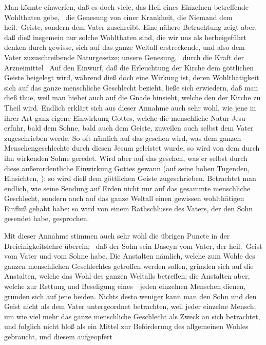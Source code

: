 \begin{aufza}
\begin{aufzb}
\begin{RWanm} 
Man könnte einwerfen, daß es doch viele, das Heil eines Einzelnen betreffende Wohlthaten gebe, \zB\ die Genesung von einer Krankheit, die Niemand dem heil.\ Geiste, sondern dem Vater zuschreibt. Eine nähere Betrachtung zeigt aber, daß dieß insgemein nur solche Wohlthaten sind, die wir uns als herbeigeführt denken durch gewisse, sich auf das ganze Weltall erstreckende, und also dem Vater zuzuschreibende Naturgesetze; unsere Genesung, \zB\ durch die Kraft der Arzneimittel \udgl\  Auf den Einwurf, daß die Erleuchtung der Kirche dem göttlichen Geiste beigelegt wird, während dieß doch eine Wirkung ist, deren Wohlthätigkeit sich auf das ganze menschliche Geschlecht bezieht, ließe sich erwiedern, daß man dieß thue, weil man hiebei auch auf die Gnade hinsieht, welche den  der Kirche zu Theil wird. Endlich erklärt sich aus dieser Annahme auch sehr wohl, wie jene in ihrer Art ganz eigene Einwirkung Gottes, welche die menschliche Natur Jesu erfuhr, bald dem Sohne, bald auch dem Geiste, zuweilen auch selbst dem Vater zugeschrieben werde. So oft nämlich auf das gesehen wird, was dem ganzen Menschengeschlechte durch diesen Jesum geleistet wurde, so wird von dem durch ihn wirkenden Sohne geredet. Wird aber auf das gesehen, was er selbst durch diese außerordentliche Einwirkung Gottes gewann (auf seine hohen Tugenden, Einsichten, \usw ): so wird dieß dem göttlichen Geiste zugeschrieben. Betrachtet man endlich, wie seine Sendung auf Erden nicht nur auf das gesammte menschliche Geschlecht, sondern auch auf das ganze Weltall einen gewissen wohlthätigen Einfluß gehabt habe: so wird von einem Rathschlusse des Vaters, der den Sohn gesendet habe, gesprochen.
\end{RWanm}
\item Mit dieser Annahme stimmen auch sehr wohl die übrigen Puncte in der Dreieinigkeitslehre überein; \zB\ daß der Sohn sein Daseyn vom Vater, der heil.\ Geist vom Vater und vom Sohne habe. Die Anstalten nämlich, welche zum Wohle des ganzen menschlichen Geschlechtes getroffen werden sollen, gründen sich auf die Anstalten, welche das Wohl des ganzen Weltalls betreffen; die Anstalten aber, welche zur Rettung und Beseligung eines~\ jeden einzelnen Menschen dienen, gründen sich auf jene beiden. Nichts desto weniger kann man den Sohn und den Geist nicht als dem Vater untergeordnet betrachten, weil jeder einzelne Mensch, um wie viel mehr das ganze menschliche Geschlecht als Zweck an sich betrachtet, und folglich nicht bloß als ein Mittel zur Beförderung des allgemeinen Wohles gebraucht, und diesem aufgeopfert 

\end{aufzb}
\end{aufza}

